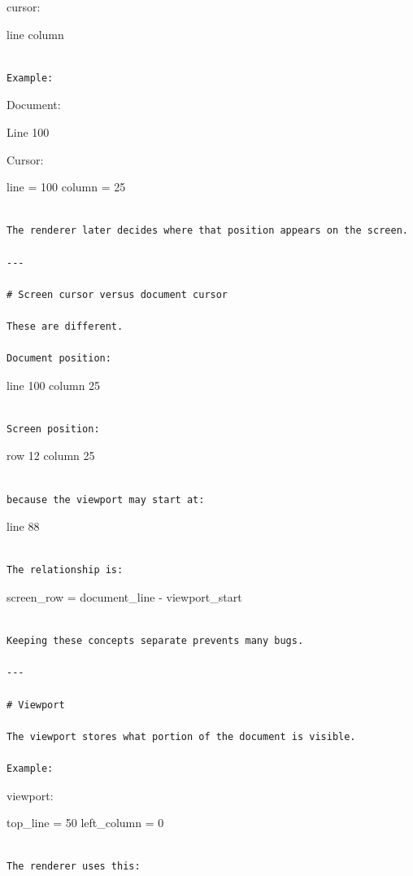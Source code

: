 \documentclass[
  oneside,
  openany]{book}
\begin{document}
cursor:

line column

\begin{verbatim}

Example:
\end{verbatim}

Document:

Line 100

Cursor:

line = 100 column = 25

\begin{verbatim}

The renderer later decides where that position appears on the screen.

---

# Screen cursor versus document cursor

These are different.

Document position:
\end{verbatim}

line 100 column 25

\begin{verbatim}

Screen position:
\end{verbatim}

row 12 column 25

\begin{verbatim}

because the viewport may start at:
\end{verbatim}

line 88

\begin{verbatim}

The relationship is:
\end{verbatim}

screen\_row = document\_line - viewport\_start

\begin{verbatim}

Keeping these concepts separate prevents many bugs.

---

# Viewport

The viewport stores what portion of the document is visible.

Example:
\end{verbatim}

viewport:

top\_line = 50 left\_column = 0

\begin{verbatim}

The renderer uses this:
\end{verbatim}
\end{document}
